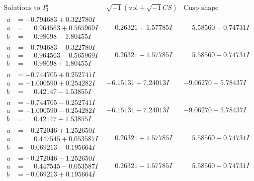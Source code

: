 \documentclass[1p]{elsarticle_modified}
\theoremstyle{definition}
\newcommand{\I}{\sqrt{-1}}
\begin{document}
$$\begin{array}{c|c|c}  
\text{Solutions to }I^u_{3}& \I (\text{vol} + \sqrt{-1}CS) & \text{Cusp shape}\\
 \hline 
\begin{aligned}
u &= -0.794683 + 0.322780 I \\
a &= \phantom{-}0.964563 + 0.565969 I \\
b &= \phantom{-}0.98698 - 1.80455 I\end{aligned}
 & \phantom{-}0.26321 + 1.57785 I & \phantom{-}5.58560 - 0.74731 I \\ \hline\begin{aligned}
u &= -0.794683 - 0.322780 I \\
a &= \phantom{-}0.964563 - 0.565969 I \\
b &= \phantom{-}0.98698 + 1.80455 I\end{aligned}
 & \phantom{-}0.26321 - 1.57785 I & \phantom{-}5.58560 + 0.74731 I \\ \hline\begin{aligned}
u &= -0.744705 + 0.252741 I \\
a &= -1.000590 + 0.254282 I \\
b &= \phantom{-}0.42147 - 1.53855 I\end{aligned}
 & -6.15131 + 7.24013 I & -9.06270 - 5.78437 I \\ \hline\begin{aligned}
u &= -0.744705 - 0.252741 I \\
a &= -1.000590 - 0.254282 I \\
b &= \phantom{-}0.42147 + 1.53855 I\end{aligned}
 & -6.15131 - 7.24013 I & -9.06270 + 5.78437 I \\ \hline\begin{aligned}
u &= -0.272046 + 1.252650 I \\
a &= \phantom{-}0.447545 + 0.053587 I \\
b &= -0.069213 - 0.195664 I\end{aligned}
 & \phantom{-}0.26321 + 1.57785 I & \phantom{-}5.58560 - 0.74731 I \\ \hline\begin{aligned}
u &= -0.272046 - 1.252650 I \\
a &= \phantom{-}0.447545 - 0.053587 I \\
b &= -0.069213 + 0.195664 I\end{aligned}
 & \phantom{-}0.26321 - 1.57785 I & \phantom{-}5.58560 + 0.74731 I \\ \hline\begin{aligned}

\end{aligned}
\end{array}$$
\end{document}
